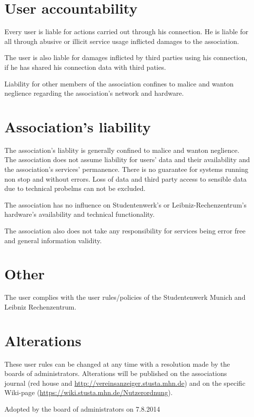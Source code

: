 \documentclass[a4paper,10pt]{scrartcl}
\begin{document}
 \section{User accountability}
 Every user is liable for actions carried out through his connection. He is liable for all through abusive or illicit service usage inflicted damages to the association.

 The user is also liable for damages inflicted by third parties using his connection, if he has shared his connection data with third paties.

 Liability for other members of the association confines to malice and wanton neglience regarding the association's network and hardware.

 \section{Association's liability}
 The association's liablity is generally confined to malice and wanton neglience. The association does not assume liability for users' data and their availability and the association's services' permanence. There is no guarantee for systems running non stop and without errors. Loss of data and third party access to sensible data due to technical probelms can not be excluded.

 The association has no influence on Studentenwerk's or Leibniz-Rechenzentrum's hardware's availability and technical functionality. 

 The association also does not take any responsibility for services being error free and general  information validity.

 \section{Other}
 The user complies with the user rules/policies of the Studentenwerk Munich and Leibniz Rechenzentrum.

 \section{Alterations}
 These user rules can be changed at any time with a resolution made by the boards of administrators. Alterations will be published on the associations journal (red house and \url{http://vereinsanzeiger.stusta.mhn.de}) and on the specific Wiki-page (\url{https://wiki.stusta.mhn.de/Nutzerordnung}).

 \hfill Adopted by the board of administrators on 7.8.2014

 
\end{document}
